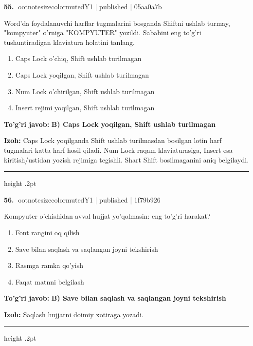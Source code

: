 \documentclass[10pt,a4paper]{article}
\begin{document}
\textbf{\color{ink}55.} {ootnotesizecolor{muted}Y1 | published | 05aa0a7b}
\par
Word'da foydalanuvchi harflar tugmalarini bosganda Shiftni ushlab turmay, "kompyuter" o'rniga "KOMPYUTER" yozildi. Sababini eng to'g'ri tushuntiradigan klaviatura holatini tanlang.
\begin{enumerate}[label=\Alph*),leftmargin=9mm]
\item Caps Lock o'chiq, Shift ushlab turilmagan
\item Caps Lock yoqilgan, Shift ushlab turilmagan
\item Num Lock o'chirilgan, Shift ushlab turilmagan
\item Insert rejimi yoqilgan, Shift ushlab turilmagan
\end{enumerate}
\begin{tcolorbox}[enhanced,breakable,colback=teal!4,colframe=teal!55!black,boxrule=0.45pt,arc=1.2mm,left=2.8mm,right=2.8mm,top=2mm,bottom=2mm]
\textbf{\color{teal}To'g'ri javob:} \textbf{B) Caps Lock yoqilgan, Shift ushlab turilmagan}
\par\smallskip
\textbf{Izoh:} Caps Lock yoqilganda Shift ushlab turilmasdan bosilgan lotin harf tugmalari katta harf hosil qiladi. Num Lock raqam klaviaturasiga, Insert esa kiritish/ustidan yozish rejimiga tegishli. Shart Shift bosilmaganini aniq belgilaydi.
\end{tcolorbox}
\vspace{2mm}\hrule height .2pt\vspace{2mm}

\textbf{\color{ink}56.} {ootnotesizecolor{muted}Y1 | published | 1f79b926}
\par
Kompyuter o'chishidan avval hujjat yo'qolmasin: eng to'g'ri harakat?
\begin{enumerate}[label=\Alph*),leftmargin=9mm]
\item Font rangini oq qilish
\item Save bilan saqlash va saqlangan joyni tekshirish
\item Rasmga ramka qo'yish
\item Faqat matnni belgilash
\end{enumerate}
\begin{tcolorbox}[enhanced,breakable,colback=teal!4,colframe=teal!55!black,boxrule=0.45pt,arc=1.2mm,left=2.8mm,right=2.8mm,top=2mm,bottom=2mm]
\textbf{\color{teal}To'g'ri javob:} \textbf{B) Save bilan saqlash va saqlangan joyni tekshirish}
\par\smallskip
\textbf{Izoh:} Saqlash hujjatni doimiy xotiraga yozadi.
\end{tcolorbox}
\vspace{2mm}\hrule height .2pt\vspace{2mm}
\end{document}
